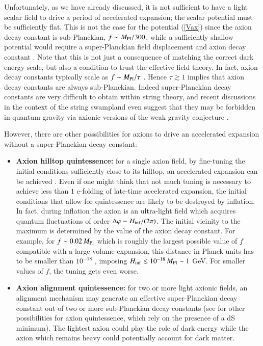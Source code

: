 Unfortunately, as we have already discussed, it is not sufficient to have a light scalar field to drive a period of accelerated expansion; the scalar potential must be sufficiently flat. This is not the case for the potential (\ref{Vax}) since the axion decay constant is sub-Planckian, $f\sim M_{\rm Pl}/300$, while a sufficiently shallow potential would require a super-Planckian field displacement and axion decay constant \cite{Freese:1990rb}. Note that this is not just a consequence of matching the correct dark energy scale, but also a condition to trust the effective field theory. In fact, axion decay constants typically scale as $f \sim M_{\rm Pl}/\tau$ \cite{Svrcek:2006hf, Svrcek:2006yi, Arvanitaki:2009fg, Cicoli:2012sz}. Hence $\tau \gtrsim 1$ implies that axion decay constants are always sub-Planckian. Indeed super-Planckian decay constants are very difficult to obtain within string theory, and recent discussions in the context of the string swampland even suggest that they may be forbidden in quantum gravity via axionic versions of the weak gravity conjecture \cite{Klaewer:2016kiy, Blumenhagen:2017cxt, Palti:2017elp, Cicoli:2018tcq, Cicoli:2021gss}.

However, there are other possibilities for axions to drive an accelerated expansion without a super-Planckian decay constant: 
\begin{itemize}
\item \textbf{Axion hilltop quintessence:} for a single axion field, by fine-tuning the initial conditions sufficiently close to its hilltop, an accelerated expansion can be achieved \cite{Kamionkowski:2014zda, Cicoli:2021skd}. Even if one might think that not much tuning is necessary to achieve less than $1$ e-folding of late-time accelerated expansion, the initial conditions that allow for quintessence are likely to be destroyed by inflation. In fact, during inflation the axion is an ultra-light field which acquires quantum fluctuations of order $\Delta\varphi\sim H_{\rm inf}/(2\pi)$. The initial vicinity to the maximum is determined by the value of the axion decay constant. For example, for $f\sim 0.02\,M_{\rm Pl}$ which is roughly the largest possible value of $f$ compatible with a large volume expansion, this distance in Planck units has to be smaller than $10^{-18}$ \cite{Cicoli:2021skd}, imposing $H_{\rm inf}\lesssim 10^{-18}\,M_{\rm Pl}\sim 1$ GeV. For smaller values of $f$, the tuning gets even worse.

\item \textbf{Axion alignment quintessence:} for two or more light axionic fields, an alignment mechanism \cite{Kim:2004rp, Dimopoulos:2005ac, Shiu:2015xda, Cicoli:2014sva} may generate an effective super-Planckian decay constant out of two or more sub-Planckian decay constants (see \cite{Cicoli:2018kdo} for other possibilities for axion quintessence, which rely on the presence of a dS minimum). The lightest axion could play the role of dark energy while the axion which remains heavy could potentially account for dark matter.
\end{itemize}


